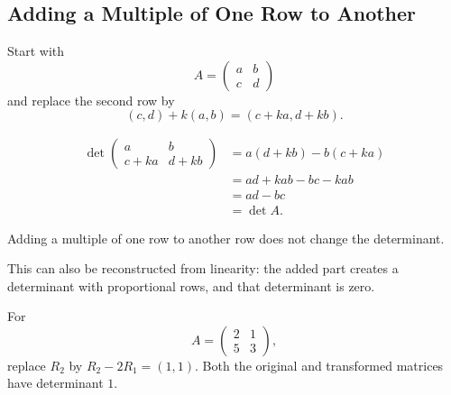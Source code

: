 \subsection{Adding a Multiple of One Row to Another}

Start with
\[
A=\begin{pmatrix}a&b\\c&d\end{pmatrix}
\]
and replace the second row by
\[
(c,d)+k(a,b)=(c+ka,d+kb).
\]

\begin{derivationbox}
\begin{align*}
\det\begin{pmatrix}a&b\\c+ka&d+kb\end{pmatrix}
&=a(d+kb)-b(c+ka)\\
&=ad+kab-bc-kab\\
&=ad-bc\\
&=\det A.
\end{align*}
\end{derivationbox}

\begin{theorembox}
Adding a multiple of one row to another row does not change the determinant.
\end{theorembox}

This can also be reconstructed from linearity: the added part creates a determinant with proportional rows, and that determinant is zero.

\begin{examplebox}
For
\[
A=\begin{pmatrix}2&1\\5&3\end{pmatrix},
\]
replace $R_2$ by $R_2-2R_1=(1,1)$. Both the original and transformed matrices have determinant $1$.
\end{examplebox}
